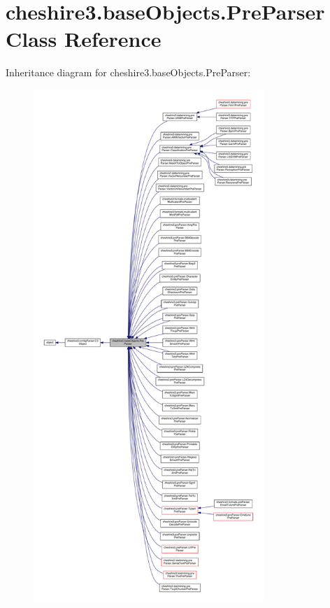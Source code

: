 \hypertarget{classcheshire3_1_1base_objects_1_1_pre_parser}{\section{cheshire3.\-base\-Objects.\-Pre\-Parser Class Reference}
\label{classcheshire3_1_1base_objects_1_1_pre_parser}
}


Inheritance diagram for cheshire3.\-base\-Objects.\-Pre\-Parser\-:
\nopagebreak
\begin{figure}[H]
\begin{center}
\leavevmode
\includegraphics[height=550pt]{classcheshire3_1_1base_objects_1_1_pre_parser__inherit__graph}
\end{center}
\end{figure}


